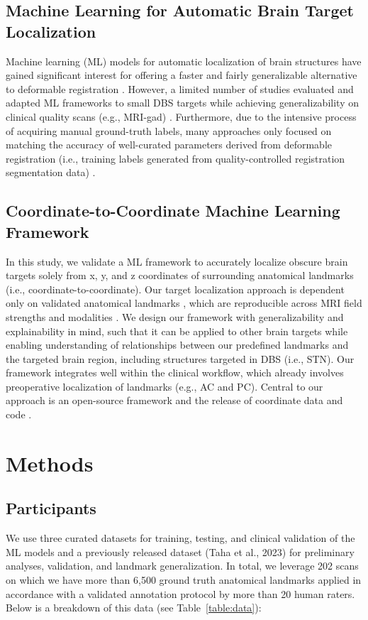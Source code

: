 \subsection{Machine Learning for Automatic Brain Target Localization}
Machine learning (ML) models for automatic localization of brain structures have gained significant interest for offering a faster and fairly generalizable alternative to deformable registration \cite{ref}. However, a limited number of studies evaluated and adapted ML frameworks to small DBS targets while achieving generalizability on clinical quality scans (e.g., MRI-gad) \cite{ref}. Furthermore, due to the intensive process of acquiring manual ground-truth labels, many approaches only focused on matching the accuracy of well-curated parameters derived from deformable registration (i.e., training labels generated from quality-controlled registration segmentation data) \cite{ref}.
\subsection{Coordinate-to-Coordinate Machine Learning Framework}
In this study, we validate a ML framework to accurately localize obscure brain targets solely from x, y, and z coordinates of surrounding anatomical landmarks (i.e., coordinate-to-coordinate). Our target localization approach is dependent only on validated anatomical landmarks \cite{ref}, which are reproducible across MRI field strengths and modalities \cite{ref}. We design our framework with generalizability and explainability in mind, such that it can be applied to other brain targets while enabling understanding of relationships between our predefined landmarks and the targeted brain region, including structures targeted in DBS (i.e., STN). Our framework integrates well within the clinical workflow, which already involves preoperative localization of landmarks (e.g., AC and PC). Central to our approach is an open-source framework and the release of coordinate data and code \cite{ref}.
\section{Methods}

\subsection{Participants}
We use three curated datasets for training, testing, and clinical validation of the ML models and a previously released dataset (Taha et al., 2023) for preliminary analyses, validation, and landmark generalization. In total, we leverage 202 scans on which we have more than 6,500 ground truth anatomical landmarks applied in accordance with a validated annotation protocol \cite{lau2019} by more than 20 human raters. Below is a breakdown of this data (see Table~\ref{table:data}):

